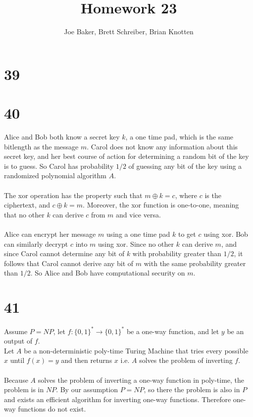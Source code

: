 \documentclass[letterpaper,notitlepage,twoside]{article}
\begin{document}
\title{Homework 23}
\author{Joe Baker, Brett Schreiber, Brian Knotten}
\maketitle

\section*{39}

\section*{40}
Alice and Bob both know a secret key $k$, a one time pad, which is the same bitlength as the message $m$.
Carol does not know any information about this secret key, and her best course of action for determining a random bit of the key is to guess.
So Carol has probability $1/2$ of guessing any bit of the key using a randomized polynomial algorithm $A$. \\\\
The xor operation has the property such that $m \oplus k = c$, where $c$ is the ciphertext, and $c \oplus k = m$. Moreover, the xor function is one-to-one, meaning that no other $k$ can derive $c$ from $m$ and vice versa. \\\\
Alice can encrypt her message $m$ using a one time pad $k$ to get $c$ using xor. Bob can similarly decrypt $c$ into $m$ using xor.
Since no other $k$ can derive $m$, and since Carol cannot determine any bit of $k$ with probability greater than $1/2$, it follows that Carol cannot derive any bit of $m$ with the same probability greater than $1/2$.
So Alice and Bob have computational security on $m$.

\section*{41}
Assume $P=NP$, let $f:\{0,1\}^{*} \rightarrow \{0,1\}^{*}$ be a one-way function, and let $y$ be an output of $f$. \\
Let $A$ be a non-deterministic poly-time Turing Machine that tries every possible $x$ until $f(x) = y$ and then returns $x$ i.e. $A$ solves the problem of inverting $f$. \\ \\
Because $A$ solves the problem of inverting a one-way function in poly-time, the problem is in $NP$.
By our assumption $P=NP$, so there the problem is also in $P$ and exists an efficient algorithm for inverting one-way functions.
Therefore one-way functions do not exist.
\end{document}

